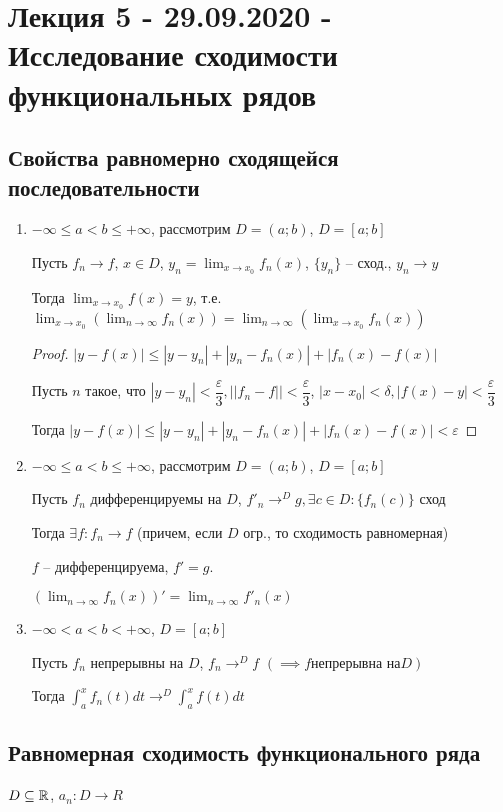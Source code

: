 \section{Лекция 5 - 29.09.2020 - Исследование сходимости функциональных рядов}
\subsection{Свойства равномерно сходящейся последовательности}
\begin{enumerate}
\item $-\infty \leq a < b \leq +\infty$, рассмотрим $D= (a; b)$, $D = [a;b]$

      Пусть $f_n \to f$, $x \in D$, $y_n = \lim_{x\to x_0} f_n(x)$, $\{y_n\}$ -- сход., $y_n \to y$

      Тогда $\lim_{x \to x_0} f(x) = y$, т.е. $\lim_{x\to x_0}(\lim_{n \to \infty} f_n(x)) = \lim_{n\to \infty} (\lim_{x \to x_0} f_n(x))$

      \begin{proof}

        $|y -f(x)| \leq |y - y_n| + |y_n - f_n(x)| + |f_n(x) - f(x)|$


        Пусть $n$ такое, что $|y - y_n| < \dfrac{\varepsilon}{3}, ||f_n - f|| < \dfrac{\varepsilon}{3}$, $|x - x_0| < \delta, |f(x) - y| < \dfrac{\varepsilon}{3}$


        Тогда $|y -f(x)| \leq |y - y_n| + |y_n - f_n(x)| + |f_n(x) - f(x)| < \varepsilon$
      \end{proof}
\item $-\infty \leq a < b \leq +\infty$, рассмотрим $D= (a; b)$, $D = [a;b]$

      Пусть $f_n$ дифференцируемы на $D$, $f'_n \to^D g, \exists c \in D: \{f_n(c)\}$ сход

      Тогда $\exists f: f_n \to f$ (причем, если $D$ огр., то сходимость равномерная)

      $f$ -- дифференцируема, $f' = g$.

      $(\lim_{n \to \infty} f_n(x))' = \lim_{n \to \infty} f'_n(x)$
\item $-\infty < a < b < +\infty$, $D=[a;b]$
      
      Пусть $f_n$ непрерывны на $D$, $f_n \to^D f$ $(\implies f \text{непрерывна на} D)$

      Тогда $\int_{a}^{x} f_n(t)dt \to^{D} \int_{a}^{x} f(t)dt$
\end{enumerate}

\subsection{Равномерная сходимость функционального ряда}
$D \subseteq \mathbb{R}$, $a_n: D \to R$

